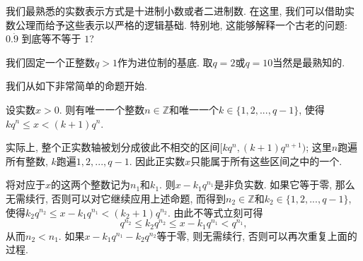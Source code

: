 

我们最熟悉的实数表示方式是十进制小数或者二进制数. 在这里, 我们可以借助实数公理而给予这些表示以严格的逻辑基础. 特别地, 这能够解释一个古老的问题: $0.\dot{9}$ 到底等不等于 $1$?

我们固定一个正整数$q>1$作为进位制的基底. 取$q=2$或$q=10$当然是最熟知的.

我们从如下非常简单的命题开始. 
\begin{lemma}{}
设实数$x>0$. 则有唯一一个整数$n\in\mathbb{Z}$和唯一一个$k\in\{1,2,...,q-1\}$, 使得$kq^n\leq x<(k+1)q^{n}$.
\end{lemma}

实际上, 整个正实数轴被划分成彼此不相交的区间$[kq^n,(k+1)q^{n+1})$; 这里$n$跑遍所有整数, $k$跑遍$1,2,...,q-1$. 因此正实数$x$只能属于所有这些区间之中的一个. 

将对应于$x$的这两个整数记为$n_1$和$k_1$. 则$x-k_1q^{n_1}$是非负实数. 如果它等于零, 那么无需续行, 否则可以对它继续应用上述命题, 而得到$n_2\in\mathbb{Z}$和$k_2\in\{1,2,...,q-1\}$, 使得$k_2q^{n_2}\leq x-k_1q^{n_1}<(k_2+1)q^{n_2}$. 由此不等式立刻可得
\[
q^{n_2}\leq k_2q^{n_2}\leq x-k_1q^{n_1}<q^{n_1},
\]
从而$n_2<n_1$. 如果$x-k_1q^{n_1}-k_2q^{n_2}$等于零, 则无需续行, 否则可以再次重复上面的过程. 